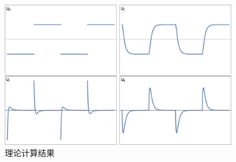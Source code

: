 \documentclass[a4paper,utf8]{article}
\begin{document}
        \begin{figure}[!ht]
            \includegraphics[width=0.9\textwidth]{2e.png}
            \caption{理论计算结果}
        \end{figure}\par
\end{document}
